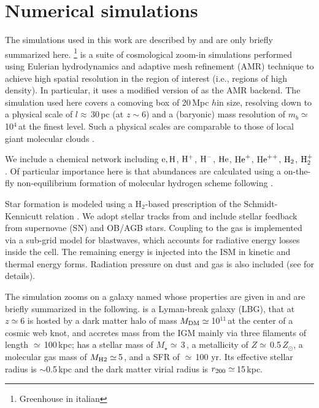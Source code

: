 \IfFileExists{emulateapjlegacy.cls}{\documentclass[iop]{emulateapjlegacy}}{\documentclass[iop]{emulateapj}}
\begin{document}
\section{Numerical simulations}\label{sec:sim}
The simulations used in this work are described by \citealt{Pallottini17a, Pallottini17b} and are only briefly summarized here.
%
\footnote{Greenhouse in italian} is a suite of cosmological zoom-in simulations performed using Eulerian hydrodynamics and adaptive mesh refinement (AMR) technique to achieve high spatial resolution in the region of interest (i.e., regions of high density).
%
In particular, it uses a modified version of  \citep{Teyssier02a} as the AMR backend. The simulation used here covers a comoving box of 20\,Mpc $h$\pmOne in size, resolving down to a physical scale of $l\approx$\,30\,pc (at $z\sim6$) and a (baryonic) mass resolution of $m_b\simeq$\,10$^4$\,\Msun at the finest level. Such a physical scales are comparable to those of local giant molecular clouds \citep[e.g.,][]{Sanders85a, Federrath13a, Goodman14a}.

We include a chemical network including ${\rm e}, \rm{H}$, $\rm{H}^{+}$, $\rm{H}^{-}$, $\rm{He}$, $\rm{He}^{+}$, $\rm{He}^{++}$, $\rm{H}_2$, $\rm{H}_2^{+}$ \citep{Grassi14a,Bovino16a}. Of particular importance here is that abundances are calculated using a on-the-fly non-equilibrium formation of molecular hydrogen scheme following \citet{Pallottini17b}.

Star formation is modeled using a H$_2$-based prescription of the Schmidt-Kennicutt relation \citep{Krumholz09a}. We adopt stellar tracks from  and include stellar feedback from supernovae (SN) and OB/AGB stars. Coupling to the gas is implemented via a sub-grid model for blastwaves, which accounts for radiative energy losses inside the cell. The remaining energy is injected into the ISM in kinetic and thermal energy forms. Radiation pressure on dust and gas is also included (see \citealt{Pallottini17a} for details).

The simulation zooms on a galaxy named \flower whose properties are given in \citet{Pallottini17b} and are briefly summarized in the following. \flower is a Lyman-break galaxy (LBG), that at $z\simeq 6$ is hosted by a dark matter halo of mass $M_{\rm DM}\simeq$\,10$^{11}$\,\Msun at the center of a cosmic web knot, and accretes mass from the IGM mainly via three filaments of length $\simeq$\,100\,kpc; \flower has a stellar mass of $M_\star\simeq$\,3\,\Msun, a metallicity of $Z\simeq$\,0.5\,$Z_{\odot}$, a molecular gas mass of $M_{\rm H2}\simeq$\,5\,\Msun, and a SFR of $\simeq$\,100\,\Msun\,yr\pmOne. Its effective stellar radius  is $\sim$0.5\,kpc and the dark matter virial radius is $r_{\rm 200}\simeq$\,15\,kpc.
\end{document}
